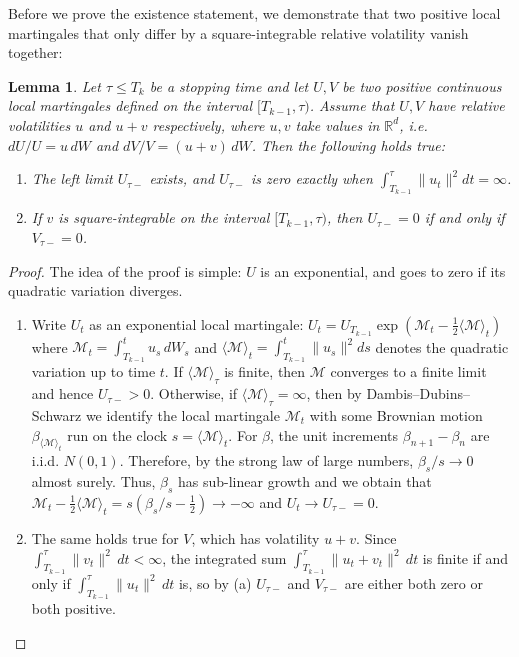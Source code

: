 \documentclass[11pt]{article}
\newcommand{\R}{\mathbb R}
\theoremstyle{plain}
\newtheorem{lemma}[theorem]{Lemma}
\theoremstyle{definition}
\theoremstyle{remark}
\begin{document}
Before we prove the existence statement, we demonstrate that two positive local martingales that only differ by a square-integrable relative volatility vanish together: 
\begin{lemma}
\label{lem:zero_sets_bh}  
Let $\tau\le T_k$ be a stopping time and let $U, V$ be two positive continuous local martingales defined on the interval $[T_{k-1},\tau)$. Assume that $U, V$ have relative volatilities $u$ and $u + v$ respectively, where $u, v$ take values in $\R^d$, i.e. $dU / U = u \,dW$ and $dV / V = (u+v) \, dW$. Then the following holds true: 
\begin{enumerate}[label=(\alph*)]
  \item The left limit $U_{\tau-}$ exists, and $U_{\tau-}$ is zero exactly when $\int_{T_{k-1}}^{\tau} \| u_t \|^2 dt = \infty $.
  \item If $v$ is square-integrable on the interval $[T_{k-1}, \tau)$, then $U_{\tau-}=0$ if and only if $V_{\tau-}=0$.
\end{enumerate}
\end{lemma}
\begin{proof}
  The idea of the proof is simple: $U$ is an exponential, and goes to zero if its quadratic variation diverges. 
  \begin{enumerate}[label=(\alph*)]
    \item Write $U_t$ as an exponential local martingale: $U_t = U_{T_{k-1}}\exp(\mathcal{M}_t - \frac{1}{2}\langle \mathcal{M} \rangle_t)$ where $\mathcal{M}_t = \int_{T_{k-1}}^t u_s \, dW_s$ and $\langle \mathcal{M} \rangle_t = \int_{T_{k-1}}^t\|u_s\|^2ds$ denotes the quadratic variation up to time $t$. If $\langle \mathcal{M} \rangle_\tau$ is finite, then $\mathcal{M}$ converges to a finite limit and hence $U_{\tau-}>0$. Otherwise, if $\langle \mathcal{M} \rangle_\tau=\infty$, then by Dambis--Dubins--Schwarz we identify the local martingale $\mathcal{M}_t$ with some Brownian motion $ \beta_{\langle \mathcal{M} \rangle_t} $ run on the clock $s = \langle \mathcal{M} \rangle_t$. For $\beta$, the unit increments $\beta_{n+1} - \beta_{n}$ are i.i.d. $N(0,1)$. Therefore, by the strong law of large numbers, $\beta_s / s \to 0$ almost surely. Thus, $\beta_s$ has sub-linear growth and we obtain that $\mathcal{M}_t - \frac{1}{2}\langle \mathcal{M}\rangle_t = s( \beta_s/s - \frac{1}{2}) \to -\infty $ and $U_t \to U_{\tau-} = 0$.
    \item The same holds true for $V$, which has volatility $u+v$. Since $\int_{T_{k-1}}^\tau\|v_t\|^2 \, dt<\infty$, the integrated sum $\int_{T_{k-1}}^\tau\|u_t+v_t\|^2 \, dt$ is finite if and only if $\int_{T_{k-1}}^\tau\|u_t\|^2 \, dt$ is, so by (a) $U_{\tau-}$ and $V_{\tau-}$ are either both zero or both positive.
  \end{enumerate}
\end{proof}
\end{document}
